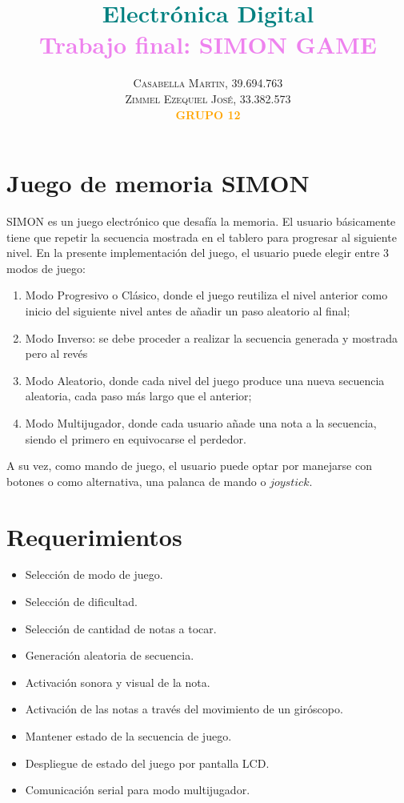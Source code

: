 \documentclass[paper=letter, fontsize=12pt]{article}
\title{\bigskip \bigskip \bigskip \bigskip \vspace{-15mm}\fontsize{28pt}{12pt}\selectfont\textbf{\textcolor{teal}{Electrónica Digital \RNum{3}}}\\
\bigskip \bigskip \fontsize{18pt}{10pt}\selectfont\textbf{\textcolor{violet}{Trabajo final: SIMON GAME}}} %
\author{
\large
{\textsc{Casabella Martin, 39.694.763 }}\\[2mm]
\bigskip
\textsc{Zimmel Ezequiel José, 33.382.573 }\\[2mm]
\bigskip
\textsc{\textbf{\textcolor{orange}{GRUPO 12}}}\\[2mm]
}
\date{}
\begin{document}
\maketitle %
\thispagestyle{fancy} %

\bigskip
\bigskip
\section{\textbf{Juego de memoria SIMON}}

SIMON es un juego electrónico que desafía la memoria. El usuario básicamente tiene que repetir la secuencia mostrada en el tablero para progresar al siguiente nivel. En la presente implementación del juego, el usuario puede elegir entre 3 modos de juego:\\
\begin{enumerate}
\item 	Modo Progresivo o Clásico, donde el juego reutiliza el nivel anterior como inicio del siguiente nivel antes de añadir un paso aleatorio al final;
\item         Modo Inverso: se debe proceder a realizar la secuencia generada y mostrada pero al revés
\item 	Modo Aleatorio, donde cada nivel del juego produce una nueva secuencia aleatoria, cada paso más largo que el anterior;
\item 	Modo Multijugador, donde cada usuario añade una nota a la secuencia, siendo el primero en equivocarse el perdedor.
\end{enumerate}

A su vez, como mando de juego, el usuario puede optar por manejarse con botones o como alternativa, una palanca de mando o $joystick$.\\
\clearpage

\section{\textbf{Requerimientos}}

\begin{itemize}
\item Selección de modo de juego.
\item Selección de dificultad.
\item Selección de cantidad de notas a tocar.
\item Generación aleatoria de secuencia.
\item Activación sonora y visual de la nota.
\item Activación de las notas a través del movimiento de un giróscopo.
\item Mantener estado de la secuencia de juego.
\item Despliegue de estado del juego por pantalla LCD.
\item Comunicación serial para modo multijugador.
\end{itemize}
\end{document}
